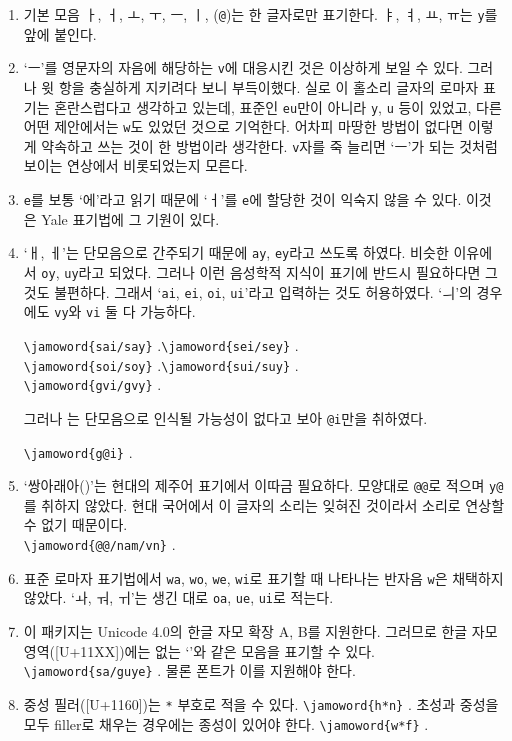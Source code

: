 \documentclass[a4paper]{oblivoir}
\begin{document}
\begin{enumerate}[1)]
\item 기본 모음 ㅏ, ㅓ, ㅗ, ㅜ, ㅡ, ㅣ, (\texttt{@})는 한 글자로만 표기한다. ㅑ, ㅕ, ㅛ, ㅠ는 \verb|y|를 앞에 붙인다.
\item `ㅡ'를 영문자의 자음에 해당하는 \verb|v|에 대응시킨 것은 이상하게 보일 수 있다. 그러나 윗 항을 충실하게 지키려다 보니 부득이했다. 실로 이 홀소리 글자의 로마자 표기는 혼란스럽다고 생각하고 있는데, 표준인 \texttt{eu}만이 아니라 \texttt{y}, \texttt{u} 등이 있었고, 다른 어떤 제안에서는 \verb|w|도 있었던 것으로 기억한다. 어차피 마땅한 방법이 없다면 이렇게 약속하고 쓰는 것이 한 방법이라 생각한다. \verb|v|자를 죽 늘리면 `ㅡ'가 되는 것처럼 보이는 연상에서 비롯되었는지 모른다.
\item \texttt{e}를 보통 `에'라고 읽기 때문에 `ㅓ'를 \verb|e|에 할당한 것이 익숙지 않을 수 있다. 이것은 Yale 표기법에 그 기원이 있다.
\item `ㅐ, ㅔ'는 단모음으로 간주되기 때문에 \texttt{ay}, \texttt{ey}라고 쓰도록 하였다. 비슷한 이유에서 \texttt{oy}, \texttt{uy}라고 되었다. 
그러나 이런 음성학적 지식이 표기에 반드시 필요하다면 그것도 불편하다. 그래서 `\texttt{ai}, \texttt{ei}, \texttt{oi}, \texttt{ui}'라고 입력하는 것도 허용하였다. `ㅢ'의 경우에도
\texttt{vy}와 \texttt{vi} 둘 다 가능하다.

\verb|\jamoword{sai/say}| .\quad \verb|\jamoword{sei/sey}| . \\
\verb|\jamoword{soi/soy}| .\quad \verb|\jamoword{sui/suy}| . \\
\verb|\jamoword{gvi/gvy}| .

그러나 는 단모음으로 인식될 가능성이 없다고 보아 \verb|@i|만을 취하였다. 

\verb|\jamoword{g@i}| .

\item `쌍아래아()'는 현대의 제주어 표기에서 이따금 필요하다. 모양대로 \verb|@@|로 적으며 \verb|y@|를 취하지 않았다. 현대 국어에서 이 글자의 소리는 잊혀진 것이라서 소리로 연상할 수 없기 때문이다.\\
\verb|\jamoword{@@/nam/vn}| .
\item 표준 로마자 표기법에서 \texttt{wa}, \texttt{wo}, \texttt{we}, \texttt{wi}로 표기할 때 나타나는 반자음 \verb|w|은 채택하지 않았다. `ㅘ, ㅝ, ㅟ'는 생긴 대로 \texttt{oa}, \texttt{ue}, \texttt{ui}로 적는다.
\item 이 패키지는 Unicode 4.0의 한글 자모 확장 A, B를 지원한다. 그러므로 한글 자모 영역([U+11XX])에는 없는 `'와 같은 모음을 표기할 수 있다. \verb|\jamoword{sa/guye}| . 물론 폰트가 이를 지원해야 한다.
\item 중성 필러([U+1160])는 \verb|*| 부호로 적을 수 있다. \verb|\jamoword{h*n}| . 초성과 중성을 모두 filler로 채우는 경우에는 종성이 있어야 한다. \verb|\jamoword{w*f}| .
\end{enumerate}
\end{document}
